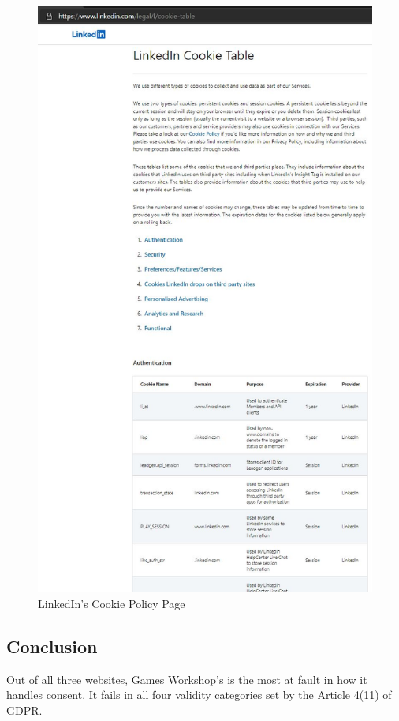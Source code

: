 \documentclass[twocolumn, letterpaper]{scrartcl}
\begin{document}
        \begin{figure}[tbp]	
        \includegraphics[width=0.9\linewidth]{ld_table.JPG}
        \caption{LinkedIn's Cookie Policy Page \label{fig:i}}
        \end{figure}
        
	\subsection*{Conclusion}
	
	Out of all three websites, Games Workshop's is the most at fault in how it handles consent. It fails in all four validity categories set by the Article 4(11) of GDPR.
	
\end{document}
